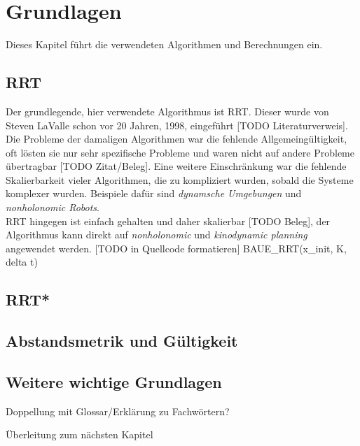 \section{Grundlagen}
Dieses Kapitel führt die verwendeten Algorithmen und Berechnungen ein.

\subsection{RRT}
Der grundlegende, hier verwendete Algorithmus ist RRT. Dieser wurde von Steven LaValle schon vor 20 Jahren, 1998, eingeführt [TODO Literaturverweis]. Die Probleme der damaligen Algorithmen war die fehlende Allgemeingültigkeit, oft lösten sie nur sehr spezifische Probleme und waren nicht auf andere Probleme übertragbar [TODO Zitat/Beleg]. Eine weitere Einschränkung war die fehlende Skalierbarkeit vieler Algorithmen, die zu kompliziert wurden, sobald die Systeme komplexer wurden. Beispiele dafür sind \textit{dynamsche Umgebungen} und \textit{nonholonomic Robots}.\\
RRT hingegen ist einfach gehalten und daher skalierbar [TODO Beleg], der Algorithmus kann direkt auf \textit{nonholonomic} und \textit{kinodynamic planning} angewendet werden.
[TODO in Quellcode formatieren]
BAUE_RRT(x_init, K, delta t)


\subsection{RRT*}

\subsection{Abstandsmetrik und Gültigkeit}
\subsection{Weitere wichtige Grundlagen}
Doppellung mit Glossar/Erklärung zu Fachwörtern?



Überleitung zum nächsten Kapitel